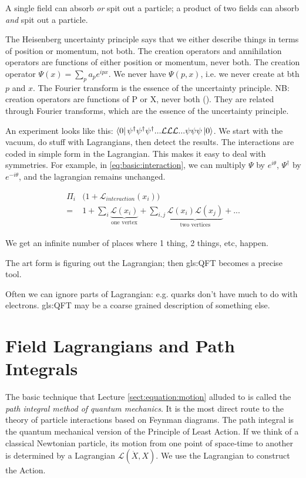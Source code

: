 \documentclass[]{article}
\begin{document}
A single field can absorb \emph{or} spit out a particle; a product of two fields can absorb \emph{and} spit out a particle.

The Heisenberg uncertainty principle says that we either describe things in terms of position or momentum, not both. The creation operators and annihilation operators are functions of either position or momentum, never both. The creation operator $\Psi(x)=\sum_{p}a_pe^{ipx}$. We never have $\Psi(p,x)$, i.e. we never create at bth $p$ and $x$. The Fourier transform is the essence of the uncertainty principle.
NB: creation operators are functions of P or X, never both (). They are related through Fourier transforms, which are the essence of the uncertainty principle.

An experiment looks like this: $\bra{0}\psi^\dagger\psi^\dagger\psi^\dagger...\mathcal{L}\mathcal{L}\mathcal{L}...\psi\psi\psi\ket{0}$. We start with the vacuum, do stuff with Lagrangians, then detect the results. The interactions are coded in simple form in the Lagrangian. This makes it easy to deal with symmetries. For example, in \eqref{eq:basic:interaction}, we can multiply $\Psi$ by $e^{i\theta}$, $\Psi^\dagger$ by $e^{-i\theta}$, and the lagrangian remains unchanged.

\begin{align*}
	\Pi_i& \big(1+\mathcal{L}_{interaction}(x_i)\big)\\
	=&1 + \sum_i \underbrace{ \mathcal{L}(x_i)}_\text{one vertex}  +\sum_{i,j}\underbrace{\mathcal{L}(x_i)\mathcal{L}(x_j)}_\text{two vertices} +...
\end{align*}

We get an infinite number of places where 1 thing, 2 things, etc, happen.

The art form is figuring out the Lagrangian; then \gls{gls:QFT} becomes a precise tool.

Often we can ignore parts of Lagrangian: e.g. quarks don't have much to do with electrons. \gls{gls:QFT} may be a coarse grained description of something else.
 

\section{Field Lagrangians and Path Integrals}

The basic technique that Lecture \ref{sect:equation:motion} alluded to is called the \emph{path integral method of quantum mechanics}. It is the most direct route to the theory of particle interactions based on Feynman diagrams. The path integral is the quantum mechanical version of the Principle of Least Action\cite{susskind2013quantum}. If we think of a classical Newtonian particle, its motion from one point of space-time to another is determined by a Lagrangian $\mathcal{L}(\dot{X},X)$. We use the Lagrangian to construct the Action. 
\end{document}
